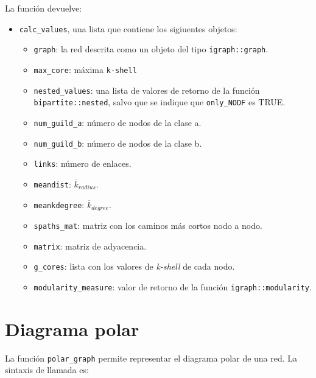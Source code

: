 La función devuelve:
\begin{itemize}
\item \texttt{calc\_values}, una lista que contiene los sigiuentes objetos:
   \begin{itemize}
   
\item \texttt{graph}: la red descrita como un objeto del tipo \texttt{igraph::graph}.

\item \texttt{max\_core}: máxima \texttt{k-shell}

\item \texttt{nested\_values}: una lista de valores de retorno de la función \texttt{bipartite::nested}, salvo que se indique que \texttt{only\_NODF} es TRUE.

\item \texttt{num\_guild\_a}: número de nodos de la clase a.

\item \texttt{num\_guild\_b}: número de nodos de la clase b.

\item \texttt{links}: número de enlaces.

\item \texttt{meandist}: $\overline {k}_{radius}$.

\item \texttt{meankdegree}:  $\overline {k}_{degree}$.

\item \texttt{spaths\_mat}: matriz con los caminos más cortos nodo a nodo.

\item \texttt{matrix}: matriz de adyacencia.

\item \texttt{g\_cores}: lista con los valores de \textit{k-shell} de cada nodo.

\item \texttt{modularity\_measure}: valor de retorno de la función \texttt{igraph::modularity}.
   \end{itemize}


\end{itemize}

\section{Diagrama polar}
\label{polar_plot}

La función \texttt{polar\_graph} permite representar el diagrama polar de una red. La sintaxis de llamada es:

